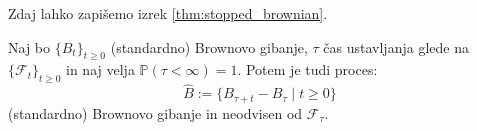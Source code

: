 \documentclass[11pt]{article}
\begin{document}
    Zdaj lahko zapišemo izrek \ref{thm:stopped_brownian}. %
    
    \begin{izrek}\label{thm:stopped_brownian}
    Naj bo \(\{B_t\}_{t \geq 0}\) (standardno) Brownovo gibanje, \(\tau\) čas ustavljanja glede na 
    \(\{\mathcal{F}_t\}_{t \geq 0}\) in naj velja \(\mathbb{P}(\tau < \infty) = 1\).
    Potem je tudi proces:
    \[
    \hat{B} := \{B_{\tau+t} - B_\tau \mid t \geq 0\}
    \]
    (standardno) Brownovo gibanje in neodvisen od \(\mathcal{F}_\tau\).
    \end{izrek}


    
\end{document}
